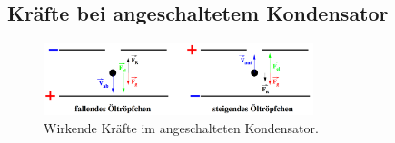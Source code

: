 \subsection{Kräfte bei angeschaltetem Kondensator}
\label{sec:Kräfte bei angeschaltetem Kondensator}

\begin{figure}[H]
    \centering
    \includegraphics[width=0.7\textwidth]{img/kraefte.png}
    \caption{Wirkende Kräfte im angeschalteten Kondensator. \cite{V503}}
    \label{fig:Gleichgewichtskraefte}
\end{figure}

